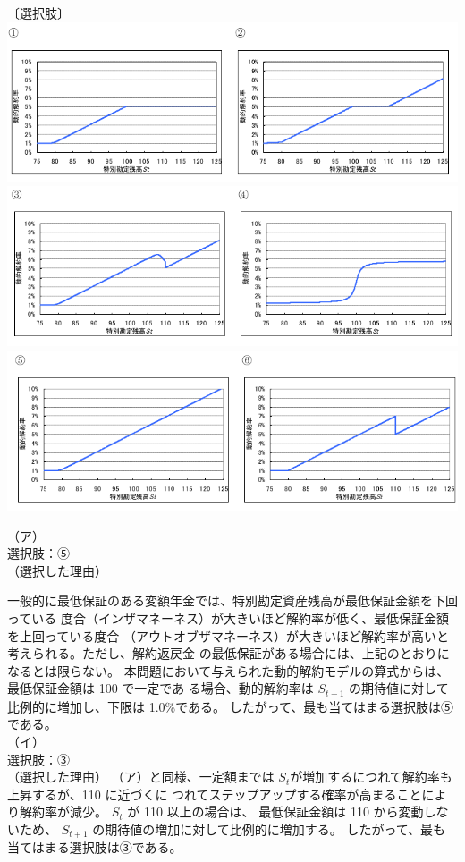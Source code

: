 \documentclass[report,gutter=10mm,fore-edge=10mm,uplatex,dvipdfmx]{jlreq}
\begin{document}
{〔選択肢〕\\
\includegraphics[scale=0.6]{images/ProbH24-1-2-2-1+2.png}\\
\includegraphics[scale=0.6]{images/ProbH24-1-2-2-3+4.png}\\
\includegraphics[scale=0.6]{images/ProbH24-1-2-2-5+6.png}

\answer{}
\noindent（ア）\\
選択肢：⑤\\
（選択した理由）

一般的に最低保証のある変額年金では、特別勘定資産残高が最低保証金額を下回っている
度合（インザマネーネス）が大きいほど解約率が低く、最低保証金額を上回っている度合
（アウトオブザマネーネス）が大きいほど解約率が高いと考えられる。ただし、解約返戻金
の最低保証がある場合には、上記のとおりになるとは限らない。
本問題において与えられた動的解約モデルの算式からは、最低保証金額は 100 で一定であ
る場合、動的解約率は $S_{t+1}$ の期待値に対して比例的に増加し、下限は 1.0\%である。
したがって、最も当てはまる選択肢は⑤である。\vspace{1zh} \\
（イ）\\
選択肢：③\\
（選択した理由）
（ア）と同様、一定額までは $S_t$が増加するにつれて解約率も上昇するが、110 に近づくに
つれてステップアップする確率が高まることにより解約率が減少。 $S_t$ が 110 以上の場合は、
最低保証金額は 110 から変動しないため、 $S_{t+1}$ の期待値の増加に対して比例的に増加する。
したがって、最も当てはまる選択肢は③である。\vspace{1zh} 

}
\end{document}
